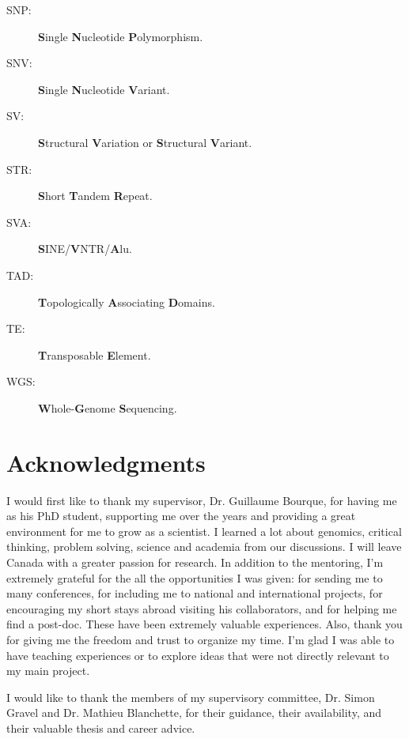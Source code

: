 \begin{description}
\item[SNP:] {\bf S}ingle {\bf N}ucleotide {\bf P}olymorphism. 
\item[SNV:] {\bf S}ingle {\bf N}ucleotide {\bf V}ariant. 
\item[SV:] {\bf S}tructural {\bf V}ariation or {\bf S}tructural {\bf V}ariant.
\item[STR:] {\bf S}hort {\bf T}andem {\bf R}epeat.
\item[SVA:] {\bf S}INE/{\bf V}NTR/{\bf A}lu.
\item[TAD:] {\bf T}opologically {\bf A}ssociating {\bf D}omains. 
\item[TE:] {\bf T}ransposable {\bf E}lement. 
\item[WGS:] {\bf W}hole-{\bf G}enome {\bf S}equencing.
\end{description}

\listoffigures %

\newpage

\listoftables %


\newpage

\section*{Acknowledgments}

I would first like to thank my supervisor, Dr. Guillaume Bourque, for having me as his PhD student, supporting me over the years and providing a great environment for me to grow as a scientist.
I learned a lot about genomics, critical thinking, problem solving, science and academia from our discussions.
I will leave Canada with a greater passion for research.
In addition to the mentoring, I'm extremely grateful for the all the opportunities I was given: for sending me to many conferences, for including me to national and international projects, for encouraging my short stays abroad visiting his collaborators, and for helping me find a post-doc.
These have been extremely valuable experiences.
Also, thank you for giving me the freedom and trust to organize my time.
I'm glad I was able to have teaching experiences or to explore ideas that were not directly relevant to my main project.

I would like to thank the members of my supervisory committee, Dr. Simon Gravel and Dr. Mathieu Blanchette, for their guidance, their availability, and their valuable thesis and career advice.

